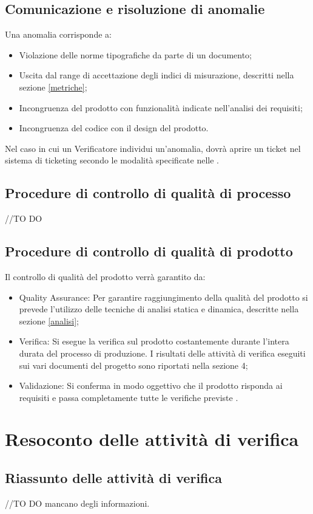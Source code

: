 \documentclass[12pt,a4paper]{article}
\begin{document}
\subsection{Comunicazione e risoluzione di anomalie}
Una anomalia corrisponde a:
\begin{itemize}
\item Violazione delle norme tipografiche da parte di un documento;
\item Uscita dal range di accettazione degli indici di misurazione, descritti nella sezione \ref{metriche};
\item Incongruenza del prodotto con funzionalità indicate nell’analisi dei requisiti;
\item Incongruenza del codice con il design del prodotto.
\end{itemize}
Nel caso in cui un Verificatore individui un’anomalia, dovrà aprire un ticket nel sistema di ticketing secondo le modalità specificate nelle \NdP.
\subsection{Procedure di controllo di qualità di processo}
//TO DO \IB
\subsection{Procedure di controllo di qualità di prodotto}
Il controllo di qualità del prodotto verrà garantito da:
\begin{itemize}
\item Quality Assurance: Per garantire raggiungimento della qualità del prodotto  si  prevede l'utilizzo delle tecniche di analisi statica e dinamica, descritte nella sezione \ref{analisi};
\item Verifica: Si esegue la verifica sul prodotto costantemente durante l'intera durata del processo di produzione. I risultati delle attività di verifica eseguiti sui vari documenti del progetto sono riportati nella sezione 4;
\item Validazione: Si conferma in modo oggettivo che il prodotto risponda ai requisiti e passa completamente tutte le verifiche previste .
\end{itemize}
\newpage
\section{ Resoconto delle attività di verifica}
\subsection{Riassunto delle attività di verifica}
//TO DO \IB mancano degli informazioni.
\end{document}
